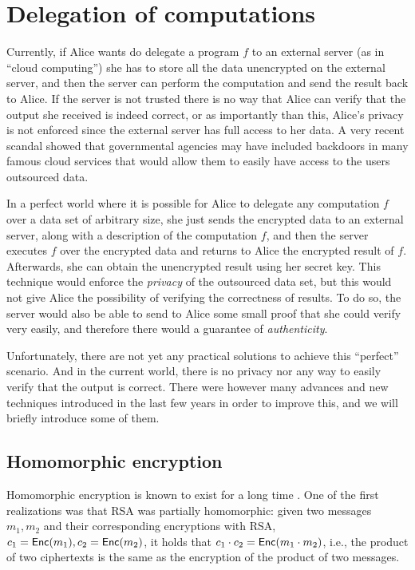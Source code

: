 \chapter{Delegation of computations}\label{chap:delegation}
Currently, if Alice wants do delegate a program $f$ to an external server (as
in ``cloud computing'') she has to store all the data unencrypted on the
external server, and then the server can perform the computation and send the
result back to Alice. If the server is not trusted there is no way that Alice
can verify that the output she received is indeed correct, or as importantly
than this, Alice's privacy is not enforced since the external server has full
access to her data.
A very recent scandal showed that governmental agencies may have included
backdoors in many famous cloud services that would allow them to easily have
access to the users outsourced data\footnotemark.

In a perfect world where it is possible for Alice to delegate any computation
$f$ over a data set of arbitrary size, she just sends the encrypted data to an
external server, along with a description of the computation $f$, and then the
server executes $f$ over the encrypted data and returns to Alice the encrypted
result of $f$. Afterwards, she can obtain the unencrypted result using her
secret key.  This technique would enforce the \emph{privacy} of the outsourced
data set, but this would not give Alice the possibility of verifying the
correctness of results. To do so, the server would also be able to send to
Alice some small proof that she could verify very easily, and therefore there
would a guarantee of \emph{authenticity}.

Unfortunately, there are not yet any practical solutions to achieve this
``perfect'' scenario. And in the current world, there is no privacy nor any way
to easily verify that the output is correct.
There
were however many advances and new techniques introduced in the last few years
in order to improve this, and we will briefly introduce some of them.
 
\section{Homomorphic encryption}
Homomorphic encryption is known to exist for a long time
\cite{rivest:adleman:dertouzos:1978}. One of the first realizations was that
RSA \cite{RSA:1978} was partially homomorphic: given two messages $m_1, m_2$
and their corresponding encryptions with RSA, $c_1 = \Enc(m_1), c_2
= \Enc(m_2)$, it holds that $c_1 \cdot c_2 = \Enc(m_1 \cdot m_2)$, i.e., the
product of two ciphertexts is the same as the encryption of the product of two
messages.

